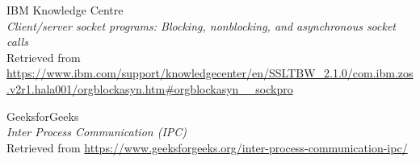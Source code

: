\documentclass[11pt]{article}
\begin{document}
\begin{thebibliography}{9}
\begin{flushleft}
	IBM Knowledge Centre \\
	\textit{Client/server socket programs: Blocking, nonblocking, and asynchronous socket calls} \\
	Retrieved from \url{https://www.ibm.com/support/knowledgecenter/en/SSLTBW_2.1.0/com.ibm.zos.v2r1.hala001/orgblockasyn.htm#orgblockasyn__sockpro}
\end{flushleft}

\begin{flushleft}
	GeeksforGeeks \\
	\textit{Inter Process Communication (IPC)} \\
	Retrieved from \url{https://www.geeksforgeeks.org/inter-process-communication-ipc/}
\end{flushleft}



\end{thebibliography}
\end{document}
